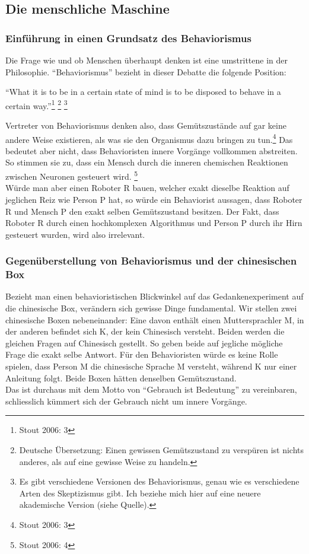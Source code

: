 \documentclass[10pt,a4paper]{article}
\begin{document}
\subsection{Die menschliche Maschine}
\subsubsection{Einführung in einen Grundsatz des Behaviorismus}
Die Frage wie und ob Menschen überhaupt denken ist eine umstrittene in der Philosophie. \enquote{Behaviorismus} bezieht in dieser Debatte die folgende Position:
\begin{displayquote}
\enquote{What it is to be in a certain state of mind is to be disposed to behave in
a certain way.}\footnote{Stout 2006: 3} \footnote{Deutsche Übersetzung: Einen gewissen Gemütszustand zu verspüren ist nichts anderes, als auf eine gewisse Weise zu handeln.} \footnote{Es gibt verschiedene Versionen des Behaviorismus, genau wie es verschiedene Arten des Skeptizismus gibt. Ich beziehe mich hier auf eine neuere akademische Version (siehe Quelle).}
\end{displayquote}
Vertreter von Behaviorismus denken also, dass Gemütszustände auf gar keine andere Weise existieren, als was sie den Organismus dazu bringen zu tun.\footnote{Stout 2006: 3} Das bedeutet aber nicht, dass Behavioristen innere Vorgänge vollkommen abstreiten. So stimmen sie zu, dass ein Mensch durch die inneren chemischen Reaktionen zwischen Neuronen gesteuert wird. \footnote{Stout 2006: 4}\\
Würde man aber einen Roboter R bauen, welcher exakt dieselbe Reaktion auf jeglichen Reiz wie Person P hat, so würde ein Behaviorist aussagen, dass Roboter R und Mensch P den exakt selben Gemütszustand besitzen. Der Fakt, dass Roboter R durch einen hochkomplexen Algorithmus und Person P durch ihr Hirn gesteuert wurden, wird also irrelevant.

\subsubsection{Gegenüberstellung von Behaviorismus und der chinesischen Box}
Bezieht man einen behavioristischen Blickwinkel auf das Gedankenexperiment auf die chinesische Box, verändern sich gewisse Dinge fundamental. Wir stellen zwei chinesische Boxen nebeneinander: Eine davon enthält einen Muttersprachler M, in der anderen befindet sich K, der kein Chinesisch versteht. Beiden werden die gleichen Fragen auf Chinesisch gestellt. So geben beide auf jegliche mögliche Frage die exakt selbe Antwort. Für den Behavioristen würde es keine Rolle spielen, dass Person M die chinesische Sprache M versteht, während K nur einer Anleitung folgt. Beide Boxen hätten denselben Gemütszustand. \\
Das ist durchaus mit dem Motto von \enquote{Gebrauch ist Bedeutung} zu vereinbaren, schliesslich kümmert sich der Gebrauch nicht um innere Vorgänge.
\end{document}
